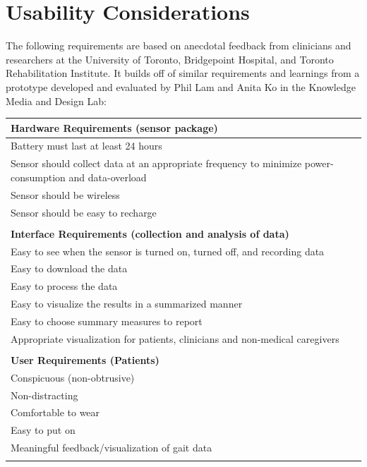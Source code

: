\documentclass[11pt, oneside]{report}
\begin{document}
\section{Usability Considerations}

The following requirements are based on anecdotal feedback from clinicians and researchers at the University of Toronto, Bridgepoint Hospital, and Toronto Rehabilitation Institute. It builds off of similar requirements and learnings from a prototype developed and evaluated by Phil Lam and Anita Ko in the Knowledge Media and Design Lab\cite{Lam2012, Ko2012}:

\begin{table}[!h]

  \begin{tabular}{p{\textwidth}}

	\textbf{Hardware Requirements (sensor package)}    \\ \hline 
	Battery must last at least 24 hours \\ \hline
	Sensor should collect data at an appropriate frequency to minimize power-consumption and data-overload \\ \hline
	Sensor should be wireless \\ \hline
	Sensor should be easy to recharge \\ \\ 
	\textbf{Interface Requirements (collection and analysis of data)}    \\ \hline 
	Easy to see when the sensor is turned on, turned off, and recording data \\ \hline
	Easy to download the data \\ \hline
	Easy to process the data \\ \hline
	Easy to visualize the results in a summarized manner \\ \hline
	Easy to choose summary measures to report \\ \hline
	Appropriate visualization for patients, clinicians and non-medical caregivers \\ \\
	
	\textbf{User Requirements (Patients)} \\ \hline 
	Conspicuous (non-obtrusive) \\ \hline 
	Non-distracting \\ \hline 
	Comfortable to wear \\ \hline 
	Easy to put on \\ \hline 
	Meaningful feedback/visualization of gait data \\ \\
	

\end{tabular}
\end{table}
\end{document}
